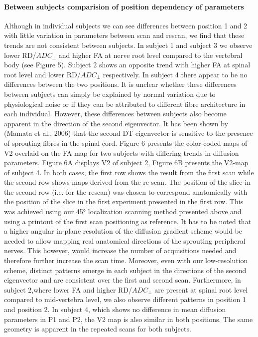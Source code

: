 \paragraph{Between subjects comparision of position dependency of parameters} Although in individual subjects we can see differences between position 1 and 2 with little variation in parameters between scan and rescan, we find that these trends are not consistent between subjects. In subject 1 and subject 3 we observe lower RD/$ADC_\perp$ and higher FA at nerve root level compared to the vertebral body (see Figure 5). Subject 2 shows an opposite trend with higher FA at spinal root level and lower RD/$ADC_\perp$ respectively. In subject 4 there appear to be no differences between the two positions. It is unclear whether these differences between subjects can simply be explained by normal variation due to physiological noise or if they can be attributed to different fibre architecture in each individual. However, these differences between subjects also become apparent in the direction of the second eigenvector. It has been shown by (Mamata et al., 2006) that the second DT eigenvector is sensitive to the presence of sprouting fibres in the spinal cord. Figure 6 presents the color-coded maps of V2 overlaid on the FA map for two subjects with differing trends in diffusion parameters. Figure 6A displays V2 of subject 2, Figure 6B presents the V2-map of subject 4. In both cases, the first row shows the result from the first scan while the second row shows maps derived from the re-scan. The position of the slice in the second row (i.e. for the rescan) was chosen to correspond anatomically with the position of the slice in the first experiment presented in the first row. This was achieved using our 45° localization scanning method presented above and using a printout of the first scan positioning as reference. It has to be noted that a higher angular in-plane resolution of the diffusion gradient scheme would be needed to allow mapping real anatomical directions of the sprouting peripheral nerves. This however, would increase the number of acquisitions needed and therefore further increase the scan time. Moreover, even with our low-resolution scheme, distinct patterns emerge in each subject in the directions of the second eigenvector and are consistent over the first and second scan. Furthermore, in subject 2,where lower FA and higher RD/$ADC_\perp$ are present at spinal root level compared to mid-vertebra level, we also observe different patterns in position 1 and position 2. In subject 4, which shows no difference in mean diffusion parameters in P1 and P2, the V2 map is also similar in both positions. The same geometry is apparent in the repeated scans for both subjects.

